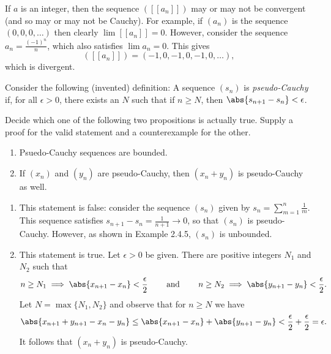 \documentclass{lew98_solutions}
\begin{document}
\begin{solution}
\begin{enumerate}
        If \( a \) is an integer, then the sequence \( ([[a_n]]) \) may or may not be convergent (and so may or may not be Cauchy). For example, if \( (a_n) \) is the sequence \( (0, 0, 0, \ldots) \) then clearly \( \lim [[a_n]] = 0 \). However, consider the sequence \( a_n = \tfrac{(-1)^n}{n} \), which also satisfies \( \lim a_n = 0 \). This gives
        \[
            ([[a_n]]) = (-1, 0, -1, 0, -1, 0, \ldots),
        \]
        which is divergent.
    \end{enumerate}
\end{solution}

\begin{exercise}
\label{ex:2.6.5}
    Consider the following (invented) definition: A sequence \( (s_n) \) is \textit{pseudo-Cauchy} if, for all \( \epsilon > 0 \), there exists an \( N \) such that if \( n \geq N \), then \( \abs{s_{n+1} - s_n} < \epsilon \).

    Decide which one of the following two propositions is actually true. Supply a proof for the valid statement and a counterexample for the other.
    \begin{enumerate}[label = (\roman*)]
        \item Psuedo-Cauchy sequences are bounded.

        \item If \( (x_n) \) and \( (y_n) \) are pseudo-Cauchy, then \( (x_n + y_n) \) is pseudo-Cauchy as well.
    \end{enumerate}
\end{exercise}

\begin{solution}
    \begin{enumerate}[label = (\roman*)]
        \item This statement is false: consider the sequence \( (s_n) \) given by \( s_n = \sum_{m=1}^n \tfrac{1}{m} \). This sequence satisfies \( s_{n+1} - s_n = \tfrac{1}{n+1} \to 0 \), so that \( (s_n) \) is pseudo-Cauchy. However, as shown in Example 2.4.5, \( (s_n) \) is unbounded.

        \item This statement is true. Let \( \epsilon > 0 \) be given. There are positive integers \( N_1 \) and \( N_2 \) such that
        \[
            n \geq N_1 \implies \abs{x_{n+1} - x_n} < \frac{\epsilon}{2} \hspaceand n \geq N_2 \implies \abs{y_{n+1} - y_n} < \frac{\epsilon}{2}.
        \]
        Let \( N = \max \{ N_1, N_2 \} \) and observe that for \( n \geq N \) we have
        \[
            \abs{x_{n+1} + y_{n+1} - x_n - y_n} \leq \abs{x_{n+1} - x_n} + \abs{y_{n+1} - y_n} < \frac{\epsilon}{2} + \frac{\epsilon}{2} = \epsilon.
        \]
        It follows that \( (x_n + y_n) \) is pseudo-Cauchy.
    \end{enumerate}
\end{solution}
\end{document}

